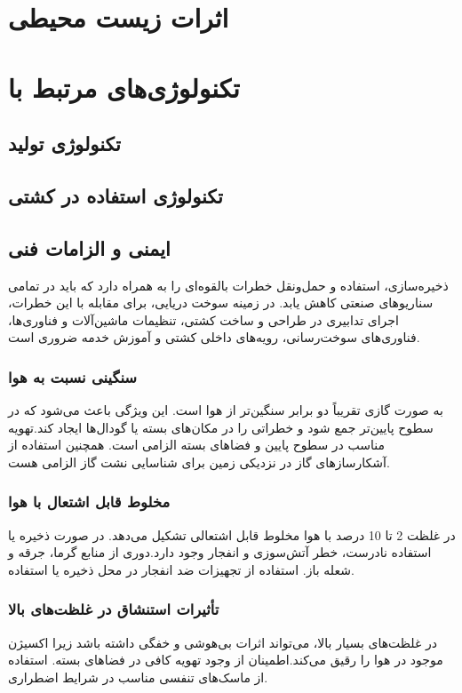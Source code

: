 \section{اثرات زیست محیطی}
\section{تکنولوژی‌های مرتبط با }
\subsection{تکنولوژی تولید}
\subsection{تکنولوژی استفاده در کشتی}
\subsection{ایمنی و الزامات فنی }
ذخیره‌سازی، استفاده و حمل‌ونقل
 خطرات بالقوه‌ای را به همراه دارد که باید در تمامی سناریوهای صنعتی کاهش یابد. در زمینه سوخت دریایی، برای مقابله با این خطرات، اجرای تدابیری در طراحی و ساخت کشتی، تنظیمات ماشین‌آلات و فناوری‌ها، فناوری‌های سوخت‌رسانی، رویه‌های داخلی کشتی و آموزش خدمه ضروری است.
\subsubsection{سنگینی نسبت به هوا}
به صورت گازی تقریباً دو برابر سنگین‌تر از هوا است. این ویژگی باعث می‌شود که در سطوح پایین‌تر جمع شود و خطراتی را در مکان‌های بسته یا گودال‌ها ایجاد کند.تهویه مناسب در سطوح پایین و فضاهای بسته الزامی است.
همچنین استفاده از آشکارسازهای گاز در نزدیکی زمین برای شناسایی نشت گاز الزامی هست.
\subsubsection{مخلوط قابل اشتعال  با هوا}
در غلظت 2 تا 10 درصد با هوا مخلوط قابل اشتعالی تشکیل می‌دهد. در صورت ذخیره یا استفاده نادرست، خطر آتش‌سوزی و انفجار وجود دارد.دوری از منابع گرما، جرقه و شعله باز.
استفاده از تجهیزات ضد انفجار در محل ذخیره یا استفاده.
\subsubsection{تأثیرات استنشاق در غلظت‌های بالا}
در غلظت‌های بسیار بالا، 
 می‌تواند اثرات بی‌هوشی و خفگی داشته باشد زیرا اکسیژن موجود در هوا را رقیق می‌کند.اطمینان از وجود تهویه کافی در فضاهای بسته.
 استفاده از ماسک‌های تنفسی مناسب در شرایط اضطراری.
